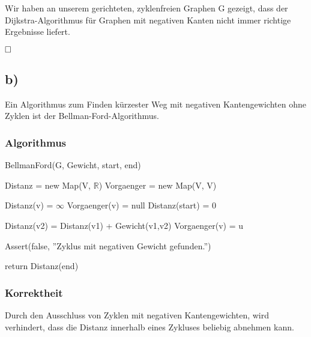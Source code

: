 \documentclass[12pt]{scrartcl}%
\theoremstyle{nonumberplain}
\newcommand{\R}{\mathbb{R}}
\begin{document}
Wir haben an unserem gerichteten, zyklenfreien Graphen G gezeigt, dass der Dijkstra-Algorithmus für Graphen mit negativen Kanten nicht immer richtige Ergebnisse liefert.

$\hfill \square $

\subsection*{b)}
Ein Algorithmus zum Finden kürzester Weg mit negativen Kantengewichten ohne Zyklen ist der Bellman-Ford-Algorithmus.

\subsubsection*{Algorithmus}
\begin{algorithm}[H]
	\LinesNumbered
	\caption{BellmanFord(G, Gewicht, start, end)}
	
	
	\BlankLine
	\BlankLine
	
	Distanz = new Map(V, $\R$)\;
	Vorgaenger = new Map(V, V)\;
	
	 {
		Distanz(v) = $\infty$\;
		Vorgaenger(v) = null\;		
	}
	Distanz(start) = 0\;
	
	\BlankLine
	\BlankLine
	
	 {
		 {
			 {
				Distanz(v2) = Distanz(v1) + Gewicht(v1,v2)\;
				Vorgaenger(v) = u\;
			}
		}
	}
	
	\BlankLine
	\BlankLine
	
	 {
		 {
			Assert(false, ''Zyklus mit negativen Gewicht gefunden.'')\;
		}
	}
	
	\BlankLine
	
	return Distanz(end)\;
\end{algorithm}

\newpage

\subsubsection*{Korrektheit}
Durch den Ausschluss von Zyklen mit negativen Kantengewichten, wird verhindert, dass die Distanz innerhalb eines Zykluses beliebig abnehmen kann.
\end{document}

